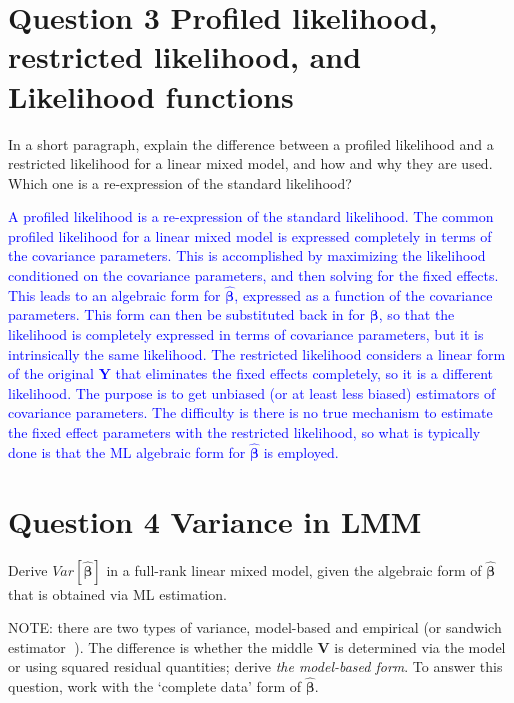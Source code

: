 \documentclass[
  12pt,
]{article}
\begin{document}
\newpage

\hypertarget{question-3-profiled-likelihood-restricted-likelihood-and-likelihood-functions}{%
\section{Question 3 Profiled likelihood, restricted likelihood, and
Likelihood
functions}\label{question-3-profiled-likelihood-restricted-likelihood-and-likelihood-functions}}

In a short paragraph, explain the difference between a profiled
likelihood and a restricted likelihood for a linear mixed model, and how
and why they are used. Which one is a re-expression of the standard
likelihood?

\textcolor{blue}{A profiled likelihood is a re-expression of the standard likelihood. The common profiled likelihood for a linear mixed model is expressed completely in terms of the covariance parameters. This is accomplished by maximizing the likelihood conditioned on the covariance parameters, and then solving for the fixed effects. This leads to an algebraic form for $\pmb {\hat \beta}$, expressed as a function of the covariance parameters. This form can then be substituted back in for $\pmb {\beta}$, so that the likelihood is completely expressed in terms of covariance parameters, but it is intrinsically the same likelihood. The restricted likelihood considers a linear form of the original $\pmb Y$ that eliminates the fixed effects completely, so it is a different likelihood. The purpose is to get unbiased (or at least less biased) estimators of covariance parameters. The difficulty is there is no true mechanism to estimate the fixed effect parameters with the restricted likelihood, so what is typically done is that the ML algebraic form for $\pmb {\hat \beta}$ is employed.}

\newpage

\hypertarget{question-4-variance-in-lmm}{%
\section{Question 4 Variance in LMM}\label{question-4-variance-in-lmm}}

Derive \(Var[\pmb {\hat \beta}]\) in a full-rank linear mixed model,
given the algebraic form of \(\pmb {\hat \beta}\) that is obtained via
ML estimation.

NOTE: there are two types of variance, model-based and empirical (or
sandwich estimator 🥪). The difference is whether the middle \(\pmb V\)
is determined via the model or using squared residual quantities; derive
\emph{the model-based form}. To answer this question, work with the
`complete data' form of \(\pmb {\hat \beta}\).
\end{document}
